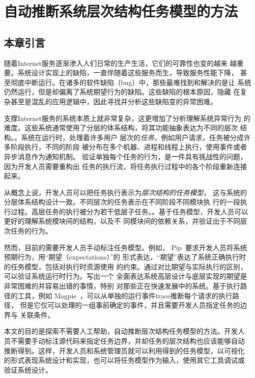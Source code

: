 \chapter{自动推断系统层次结构任务模型的方法}
\label{chap:scalpel}

\section{本章引言}

随着Internet服务逐渐渗入人们日常的生产生活，它们的可靠性也变的越来
越重要。系统设计实现上的缺陷，一直伴随着这些服务而生，导致服务性能下降，
甚至彻底中断运行。在诸多的软件缺陷（bug）中，那些最难找到和解决的是让
系统仍然运行，但是却偏离了系统期望行为的缺陷。这些缺陷的根本原因，隐藏
在复杂甚至是混乱的应用逻辑中，因此寻找并分析这些缺陷变的异常困难。

支撑Internet服务的系统本质上就非常复杂，这更增加了分析理解系统异常行为
的难度。这些系统通常使用了分层的体系结构，将其功能抽象表达为不同的层次
结构。。系统在运行时，处理着许多用户
层次的\emph{任务}，例如用户请求，任务被分成许多阶段执行，不同的阶段
被分布在多个机器、进程和线程上执行，使用事件或者异步消息作为通知机制。
验证单独每个任务的行为，是一件具有挑战性的问题，因为开发人员需要重构出
任务的执行流，将任务执行过程中的各个阶段重新连接起来。

从概念上说，开发人员可以把任务执行表示为\emph{层次结构的任务模型}，
这与系统的分层体系结构设计一致。不同层次的任务表示在不同阶段不同模块执
行的一段执行过程。高层任务的执行被分为若干低层子任务。。基于任务模型，开发人员可以更好的理解系统模块间的结构，以及不
同模块间的依赖关系，并验证出于不同层次任务的行为。

然而，目前的需要开发人员手动标注任务模型。例如，
Pip~\cite{pip}要求开发人员将系统预期行为，用“期望（expectations）”的
形式表达，“期望”表达了系统正确执行时的任务模型，包括对执行时资源使用
的约束。通过对比期望与实际执行的区别，可以验证系统运行时行为。写出一个
全面表达系统高层设计与底层实现的期望是非常困难的并容易出错的事情，特别
对那些正在快速发展中的系统。基于执行路径的工具，例如
Magpie~\cite{magpie}，可以从单独的运行事件trace推断每个请求的执行路径，
但是它仅可以处理的一组事前确定的事件，并且需要开发人员指定任务的边界与
关联条件。

本文的目的是探索不需要人工帮助，自动推断层次结构任务模型的方法。开发人
员不需要手动标注源代码来指定任务边界，并却任务的层次结构也应该能够自动
推断得到。这样，开发人员和系统管理员就可以利用得到的任务模型，以可视化
的形式表现系统设计和实现，也可以将任务模型作为输入，使用其它工具调试或
验证系统设计。

